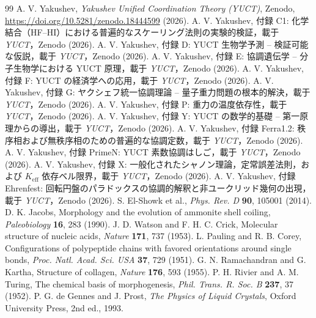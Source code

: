 \documentclass[11pt,a4paper]{article}
\begin{document}
	\begin{thebibliography}{99}
		A. V. Yakushev, \emph{Yakushev Unified Coordination Theory (YUCT)}, Zenodo, \url{https://doi.org/10.5281/zenodo.18444599} (2026).
		A. V. Yakushev, 付録 C1: 化学結合（HF–HI）における普遍的なスケーリング法則の実験的検証，載于 \emph{YUCT}，Zenodo (2026).
		A. V. Yakushev, 付録 D: YUCT 生物学予測 – 検証可能な仮説，載于 \emph{YUCT}，Zenodo (2026).
		A. V. Yakushev, 付録 E: 協調遺伝学 – 分子生物学における YUCT 原理，載于 \emph{YUCT}，Zenodo (2026).
		A. V. Yakushev, 付録 F: YUCT の経済学への応用，載于 \emph{YUCT}，Zenodo (2026).
		A. V. Yakushev, 付録 G: ヤクシェフ統一協調理論 – 量子重力問題の根本的解決，載于 \emph{YUCT}，Zenodo (2026).
		A. V. Yakushev, 付録 P: 重力の温度依存性，載于 \emph{YUCT}，Zenodo (2026).
		A. V. Yakushev, 付録 Y: YUCT の数学的基礎 – 第一原理からの導出，載于 \emph{YUCT}，Zenodo (2026).
		A. V. Yakushev, 付録 Ferra1.2: 秩序相および無秩序相のための普遍的な協調定数，載于 \emph{YUCT}，Zenodo (2026).
		A. V. Yakushev, 付録 PrimeN: YUCT 素数協調はしご，載于 \emph{YUCT}，Zenodo (2026).
		A. V. Yakushev, 付録 X: 一般化されたシャノン理論，定常誤差法則，および \(K_{\mathrm{eff}}\) 依存ベル限界，載于 \emph{YUCT}，Zenodo (2026).
		A. V. Yakushev, 付録 Ehrenfest: 回転円盤のパラドックスの協調的解釈と非ユークリッド幾何の出現，載于 \emph{YUCT}，Zenodo (2026).
		S. El-Showk et al., \emph{Phys. Rev. D} \textbf{90}, 105001 (2014).
		D. K. Jacobs, Morphology and the evolution of ammonite shell coiling, \emph{Paleobiology} \textbf{16}, 283 (1990).
		J. D. Watson and F. H. C. Crick, Molecular structure of nucleic acids, \emph{Nature} \textbf{171}, 737 (1953).
		L. Pauling and R. B. Corey, Configurations of polypeptide chains with favored orientations around single bonds, \emph{Proc. Natl. Acad. Sci. USA} \textbf{37}, 729 (1951).
		G. N. Ramachandran and G. Kartha, Structure of collagen, \emph{Nature} \textbf{176}, 593 (1955).
		P. H. Rivier and A. M. Turing, The chemical basis of morphogenesis, \emph{Phil. Trans. R. Soc. B} \textbf{237}, 37 (1952).
		P. G. de Gennes and J. Prost, \emph{The Physics of Liquid Crystals}, Oxford University Press, 2nd ed., 1993.

\end{thebibliography}
\end{document}
